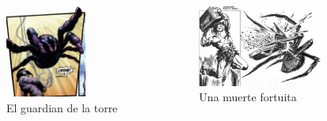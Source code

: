 \begin{frame}{}
\begin{columns}
    \begin{figure}[htb]
    \centering
        \includegraphics[width=0.7\textwidth]{img/res/13}
        \caption{El guardian de la torre}
    \end{figure}    
    \begin{figure}[htb]
    \centering
        \includegraphics[width=0.85\textwidth]{img/res/14}
        \caption{Una muerte fortuita}
    \end{figure}    
\end{columns}
\end{frame}

